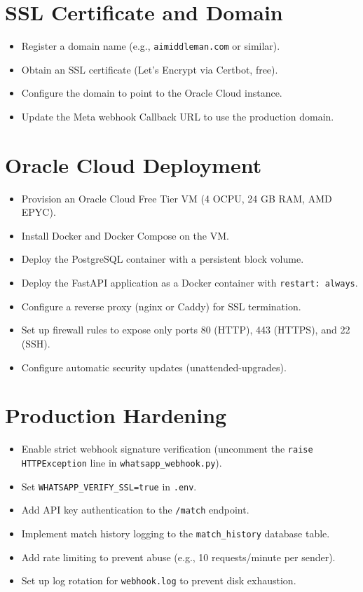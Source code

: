 \documentclass[12pt, a4paper]{report}
\begin{document}
\section{SSL Certificate and Domain}

\begin{itemize}[itemsep=3pt]
    \item Register a domain name (e.g., \texttt{aimiddleman.com} or similar).
    \item Obtain an SSL certificate (Let's Encrypt via Certbot, free).
    \item Configure the domain to point to the Oracle Cloud instance.
    \item Update the Meta webhook Callback URL to use the production domain.
\end{itemize}

\section{Oracle Cloud Deployment}

\begin{itemize}[itemsep=3pt]
    \item Provision an Oracle Cloud Free Tier VM (4 OCPU, 24 GB RAM, AMD EPYC).
    \item Install Docker and Docker Compose on the VM.
    \item Deploy the PostgreSQL container with a persistent block volume.
    \item Deploy the FastAPI application as a Docker container with \texttt{restart: always}.
    \item Configure a reverse proxy (nginx or Caddy) for SSL termination.
    \item Set up firewall rules to expose only ports 80 (HTTP), 443 (HTTPS), and 22 (SSH).
    \item Configure automatic security updates (unattended-upgrades).
\end{itemize}

\section{Production Hardening}

\begin{itemize}[itemsep=3pt]
    \item Enable strict webhook signature verification (uncomment the \texttt{raise HTTPException} line in \texttt{whatsapp\_webhook.py}).
    \item Set \texttt{WHATSAPP\_VERIFY\_SSL=true} in \texttt{.env}.
    \item Add API key authentication to the \texttt{/match} endpoint.
    \item Implement match history logging to the \texttt{match\_history} database table.
    \item Add rate limiting to prevent abuse (e.g., 10 requests/minute per sender).
    \item Set up log rotation for \texttt{webhook.log} to prevent disk exhaustion.
\end{itemize}
\end{document}
